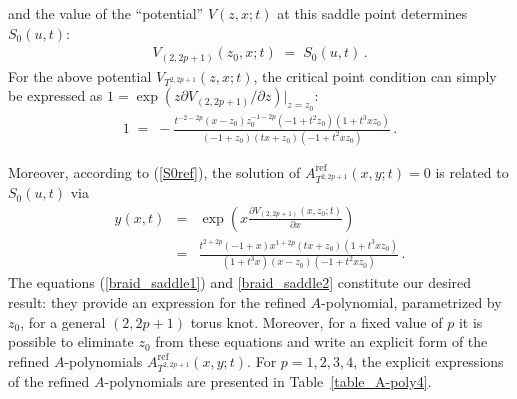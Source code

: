\documentclass[hyper,letterpaper]{JHEP3}
\begin{document}
and the value of the ``potential'' $V(z,x;t)$ at this saddle point determines $S_0(u,t)$:
\begin{eqnarray}
V_{(2,2p+1)}(z_0,x;t) \; = \; S_0(u,t) \,.
\end{eqnarray}
For the above potential $V_{T^{2,2p+1}}(z,x;t)$,
the critical point condition can simply be expressed as $1=\exp\left(z\partial V_{(2,2p+1)}/\partial z\right)|_{z=z_0}$:
\begin{eqnarray}
1 \; = \; -\frac{t^{-2-2p}(x-z_0)z_0^{-1-2p}(-1+t^2z_0)(1+t^3 xz_0)}{(-1+z_0)(tx+z_0)(-1 +  t^2 x z_0)} \,.
\label{braid_saddle1}
\end{eqnarray}

Moreover, according to (\ref{S0ref}), the solution of $A^{\text{ref}}_{T^{2,2p+1}}(x,y;t)=0$ is related to $S_0(u,t)$ via
\begin{eqnarray}
y(x,t)&=&\exp\left(x\frac{\partial V_{(2,2p+1)}(x,z_0;t)}{\partial x}\right)
\nonumber \\
&=&\frac{t^{2 + 2 p} (-1 + x) x^{1 + 2 p} (t x + z_0) (1 + t^3 x z_0)}{(1 + t^3 x) (x - z_0) (-1 + t^2 x z_0)} \,.
\label{braid_saddle2}
\end{eqnarray}
The equations (\ref{braid_saddle1}) and \eqref{braid_saddle2} constitute our desired result:
they provide an expression for the refined $A$-polynomial, parametrized by $z_0$, for a general $(2,2p+1)$ torus knot.
Moreover, for a fixed value of $p$ it is possible to eliminate $z_0$ from these equations
and write an explicit form of the refined $A$-polynomials $A^{\text{ref}}_{T^{2,2p+1}}(x,y;t)$.
For $p=1,2,3,4$, the explicit expressions of the refined $A$-polynomials are presented in Table~\ref{table_A-poly4}.
\end{document}
